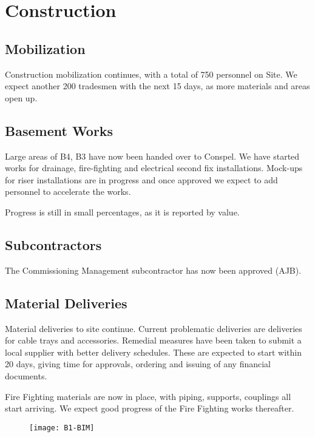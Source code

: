 \chapter{Construction}

\section{Mobilization} 

Construction mobilization continues, with a total of 750 personnel on Site. We expect another 200 tradesmen with the next 15 days, as more materials and areas open up.

\section{Basement Works}

Large areas of B4, B3 have now been handed over to Conspel. We have started works for drainage, fire-fighting and electrical second fix installations. Mock-ups for riser installations are in progress and once approved we expect to add personnel to accelerate the works.

Progress is still in small percentages, as it is reported by value. 

\section{Subcontractors}

The Commissioning Management subcontractor has now been approved (AJB).

\section{Material Deliveries}

Material deliveries to site continue. Current problematic deliveries are deliveries for cable trays and accessories. Remedial measures have been
taken to submit a local supplier with better delivery schedules. These are expected to start within 20 days, giving time for approvals, ordering
and issuing of any financial documents.

Fire Fighting materials are now in place, with piping, supports, couplings all start arriving. We expect good progress of the Fire Fighting works
thereafter.

\begin{figure}[htbp]
\texttt{[image: B1-BIM]}
\end{figure}

